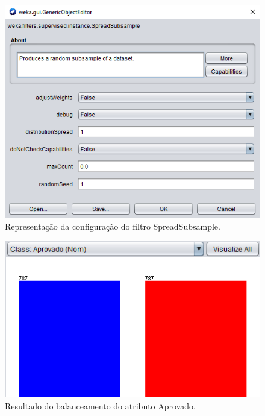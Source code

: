\par
\begin{figure}[!htp]
	\begin{center}
    \caption{\label{fig:waveform_fig} Representação da configuração  do filtro SpreadSubsample.}
	\includegraphics[scale=0.80]{Figuras/SpreadSubsample.png}
	\end{center}
\end{figure}

\par
\begin{figure}[!htp]
	\begin{center}
    \caption{\label{fig:waveform_fig} Resultado do balanceamento do atributo Aprovado.}
	\includegraphics[scale=0.80]{Figuras/Atributo_aprovado_balanceado.png}
	\end{center}
\end{figure}

